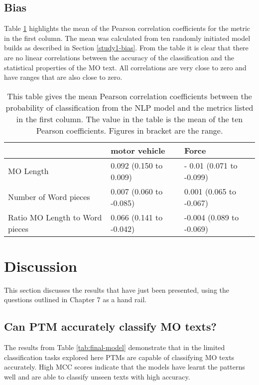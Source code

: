 \subsection{Bias} Table \ref{tab:PF1_bias} highlights the mean of the Pearson correlation coefficients for the metric in the first column. The mean was calculated from ten randomly initiated model builds as described in Section \ref{study1-bias}. From the table it is clear that there are no linear correlations between the accuracy of the classification and the statistical properties of the MO text. All correlations are very close to zero and have ranges that are also close to zero.


\begin{table}[]
\begin{tabular}{@{}lll@{}}
\toprule
                               & motor vehicle            & Force                    \\ \midrule
MO Length                      & 0.092 (0.150 to 0.009)  & - 0.01 (0.071 to -0.099) \\
Number of Word pieces          & 0.007 (0.060 to -0.085) & 0.001 (0.065 to -0.067)  \\
Ratio MO Length to Word pieces & 0.066 (0.141 to -0.042) & -0.004 (0.089 to -0.069) \\ \bottomrule
\end{tabular}

\caption[PF1 data - bias results]{\label{tab:PF1_bias} This table gives the mean Pearson correlation coefficients between the probability of classification from the NLP model and the metrics listed in the first column.  The value in the table is the mean of the ten Pearson coefficients. Figures in bracket are the range.}
\end{table}





\section{Discussion} This section discusses the results that have just been presented, using the questions outlined in Chapter 7 as a hand rail.

\subsection{Can PTM accurately classify MO texts? } The results from Table \ref{tab:final-model} demonstrate that in the limited classification tasks explored here PTMs are capable of classifying MO texts accurately. High MCC scores indicate that the models have learnt the patterns well and are able to classify unseen texts with high accuracy. 


